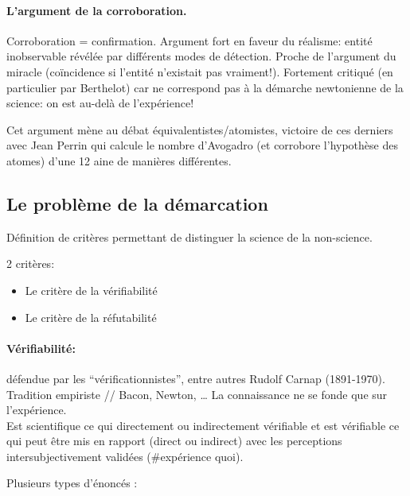 \documentclass{report}
\begin{document}
	\paragraph{L’argument de la corroboration.} Corroboration = confirmation. Argument fort en faveur du réalisme: entité inobservable révélée par différents modes de détection. Proche de l’argument du miracle (coïncidence si l’entité n’existait pas vraiment!). Fortement critiqué (en particulier par Berthelot) car ne correspond pas à la démarche newtonienne de la science: on est au-delà de l’expérience!
	
	Cet argument mène au débat équivalentistes/atomistes, victoire de ces derniers avec Jean Perrin qui calcule le nombre d'Avogadro (et corrobore l'hypothèse des atomes) d'une 12 aine de manières différentes.
	
	\subsection{Le problème de la démarcation}
	
	Définition de critères permettant de distinguer la science de la non-science.
	
	2 critères:
	\begin{itemize}
		\item Le critère de la vérifiabilité
		\item Le critère de la réfutabilité
	\end{itemize}
	
	\paragraph{Vérifiabilité:} défendue par les “vérificationnistes”, entre autres Rudolf Carnap (1891-1970). Tradition empiriste // Bacon, Newton, … La connaissance ne se fonde que sur l’expérience.\\
	Est scientifique ce qui directement ou indirectement vérifiable et est vérifiable ce qui peut être mis en rapport (direct ou indirect) avec les perceptions intersubjectivement validées (\#expérience quoi).
	
	Plusieurs types d’énoncés :
	
\end{document}
